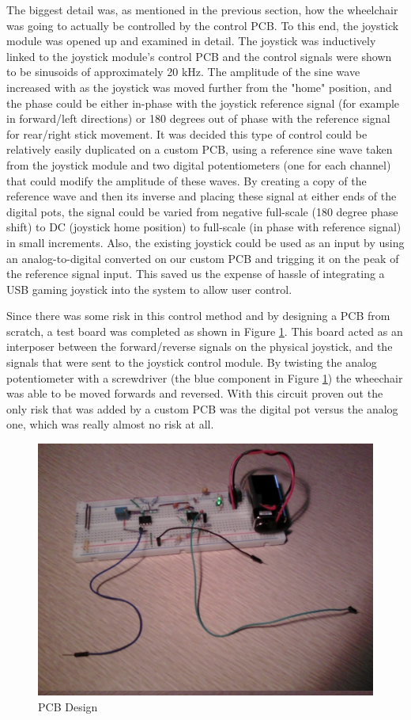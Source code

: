 \documentclass[oneside,final,a4paper]{report}
\begin{document}
The biggest detail was, as mentioned in the previous section, how the wheelchair was going to actually be controlled by the control PCB. To this end, the joystick module was opened up and examined in detail. The joystick was inductively linked to the joystick module's control PCB and the control signals were shown to be sinusoids of approximately 20 kHz. The amplitude of the sine wave increased with as the joystick was moved further from the "home" position, and the phase could be either in-phase with the joystick reference signal (for example in forward/left directions) or 180 degrees out of phase with the reference signal for rear/right stick movement. It was decided this type of control could be relatively easily duplicated on a custom PCB, using a reference sine wave taken from the joystick module and two digital potentiometers (one for each channel) that could modify the amplitude of these waves. By creating a copy of the reference wave and then its inverse and placing these signal at either ends of the digital pots, the signal could be varied from negative full-scale (180 degree phase shift) to DC (joystick home position) to full-scale (in phase with reference signal) in small increments. Also, the existing joystick could be used as an input by using an analog-to-digital converted on our custom PCB and trigging it on the peak of the reference signal input. This saved us the expense of hassle of integrating a USB gaming joystick into the system to allow user control.

Since there was some risk in this control method and by designing a PCB from scratch, a test board was completed as shown in Figure \ref{fig:test_joystick}. This board acted as an interposer between the forward/reverse signals on the physical joystick, and the signals that were sent to the joystick control module. By twisting the analog potentiometer with a screwdriver (the blue component in Figure \ref{fig:test_joystick}) the wheechair was able to be moved forwards and reversed. With this circuit proven out the only risk that was added by a custom PCB was the digital pot versus the analog one, which was really almost no risk at all.
\begin{figure}[hbt]
 \centering
 \includegraphics[scale=0.5]{test_circuit}
 \caption{PCB Design}\label{fig:test_joystick}
\end{figure}
\end{document}
